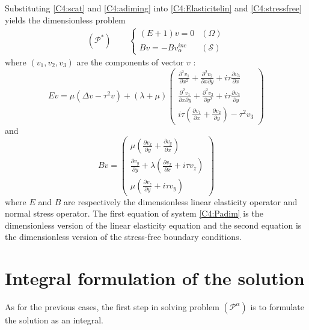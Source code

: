 Substituting \eqref{C4:scat} and \eqref{C4:adiming} into \eqref{C4:Elasticitelin} and \eqref{C4:stressfree} yields the dimensionless problem
\begin{eqnarray}
(\mathcal{P}^*) \hspace{2em} \left\{
\begin{array}{lr}
(E+1)v=0 & (\Omega) \\
Bv=-Bv_{\alpha}^{inc} & (\mathcal{S})
\end{array}
\right.
\label{C4:Padim}
\end{eqnarray}
where $(v_1,v_2,v_3)$ are the components of vector $v$ :
\begin{equation}
Ev=\mu (\Delta v -\tau^2 v)+(\lambda+\mu)
\begin{pmatrix}
\frac{\partial^2 v_1}{\partial x^2}+\frac{\partial^2 v_2}{\partial x \partial y} + i\tau\frac{\partial v_3}{\partial x} \\
\frac{\partial^2 v_1}{\partial x \partial y}+\frac{\partial^2 v_2}{\partial y^2}+ i\tau\frac{\partial v_3}{\partial y}\\
i\tau\left( \frac{\partial v_1}{\partial x}+\frac{\partial v_2}{\partial y}\right)-\tau^2 v_3
\end{pmatrix}
\label{C4:Eadim}
\end{equation}
and
\begin{equation}
Bv=\begin{pmatrix}
\mu \left(\frac{\partial v_x}{\partial y}+\frac{\partial v_y}{\partial x}\right) \\
\frac{\partial v_y}{\partial y}+\lambda\left( \frac{\partial v_x}{\partial x}+i\tau v_z\right)\\
\mu \left(\frac{\partial v_z}{\partial y}+i\tau v_y\right)
\end{pmatrix}
\label{C4:Badim}
\end{equation}
where $E$ and $B$ are respectively the dimensionless linear elasticity operator and normal stress operator. The first equation of system \eqref{C4:Padim} is the dimensionless version of the linear elasticity equation and the second equation is the dimensionless version of the stress-free boundary conditions.

\section{Integral formulation of the solution}
As for the previous cases, the first step in solving problem $(\mathcal{P}^{\alpha})$ is to formulate the solution as an integral. 
